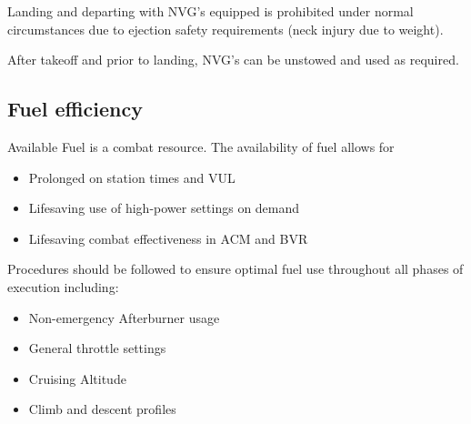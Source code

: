 Landing and departing with NVG's equipped is prohibited under normal
circumstances due to ejection safety requirements (neck injury due to weight).

After takeoff and prior to landing, NVG's can be unstowed and used as required.

\newpage

\subsection{Fuel efficiency}

Available Fuel is a combat resource. The availability of fuel allows for

\begin{itemize}

  \item Prolonged on station times and VUL

  \item Lifesaving use of high-power settings on demand

  \item Lifesaving combat effectiveness in ACM and BVR

\end{itemize}

Procedures should be followed to ensure optimal fuel use throughout all phases
of execution including:

\begin{itemize}

  \item Non-emergency Afterburner usage

  \item General throttle settings

  \item Cruising Altitude

  \item Climb and descent profiles

\end{itemize}

